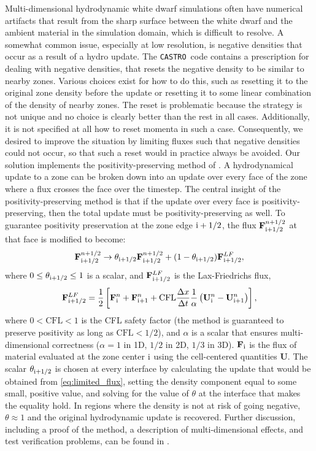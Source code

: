 \documentclass[twocolumn,numberedappendix]{../aastex6}
\newcommand{\castro}{\texttt{CASTRO}}
\begin{document}
Multi-dimensional hydrodynamic white dwarf simulations often have numerical artifacts
that result from the sharp surface between the white dwarf and the ambient material
in the simulation domain, which is difficult to resolve. A somewhat common issue, especially
at low resolution, is negative densities that occur as a result of a hydro update.
The \castro\ code contains a prescription for dealing with negative densities, that
resets the negative density to be similar to nearby zones. Various choices exist
for how to do this, such as resetting it to the original zone density before the
update or resetting it to some linear combination of the density of nearby zones.
The reset is problematic because the strategy is not unique and no choice is
clearly better than the rest in all cases. Additionally, it is not specified at all
how to reset momenta in such a case. Consequently, we desired to improve the situation
by limiting fluxes such that negative densities could not occur, so that such a
reset would in practice always be avoided. Our solution implements the positivity-preserving
method of \cite{hu:2013}. A hydrodynamical update to a zone can be broken down into
an update over every face of the zone where a flux crosses the face over the timestep.
The central insight of the positivity-preserving method is that if the update over every
face is positivity-preserving, then the total update must be positivity-preserving as well.
To guarantee positivity preservation at the zone edge ${\rm i}+1/2$, the flux
$\mathbf{F}^{n+1/2}_{{\rm i}+1/2}$ at that face is modified to become:
\begin{equation}
  \mathbf{F}^{n+1/2}_{{\rm i}+1/2} \rightarrow \theta_{{\rm i}+1/2} \mathbf{F}^{n+1/2}_{{\rm i}+1/2} + (1 - \theta_{{\rm i}+1/2}) \mathbf{F}^{LF}_{{\rm i}+1/2}, \label{eq:limited_flux}
\end{equation}
where $0 \leq \theta_{{\rm i}+1/2} \leq 1$ is a scalar, and $\mathbf{F}^{LF}_{{\rm i}+1/2}$ is the Lax-Friedrichs flux,
\begin{equation}
  \mathbf{F}^{LF}_{{\rm i}+1/2} = \frac{1}{2}\left[\mathbf{F}^{n}_{{\rm i}} + \mathbf{F}^{n}_{{\rm i}+1} + \text{CFL}\frac{\Delta x}{\Delta t} \frac{1}{\alpha}\left(\mathbf{U}^{n}_{{\rm i}} - \mathbf{U}^{n}_{{\rm i}+1}\right)\right],
\end{equation}
where $0 < \text{CFL} < 1$ is the CFL safety factor (the method is guaranteed to
preserve positivity as long as $\text{CFL} < 1/2$), and $\alpha$ is a scalar that
ensures multi-dimensional correctness ($\alpha = 1$ in 1D, $1/2$ in 2D, $1/3$ in 3D).
$\mathbf{F}_{{\rm i}}$ is the flux of material evaluated at the zone center ${\rm i}$
using the cell-centered quantities $\mathbf{U}$. The scalar $\theta_{{\rm i}+1/2}$ is
chosen at every interface by calculating the update that would be obtained from
\autoref{eq:limited_flux}, setting the density component equal to some small, positive
value, and solving for the value of $\theta$ at the interface that makes
the equality hold. In regions where the density is not at risk of going negative,
$\theta \approx 1$ and the original hydrodynamic update is recovered.
Further discussion, including a proof of the method, a description of multi-dimensional effects,
and test verification problems, can be found in \cite{hu:2013}.

\clearpage



\end{document}
